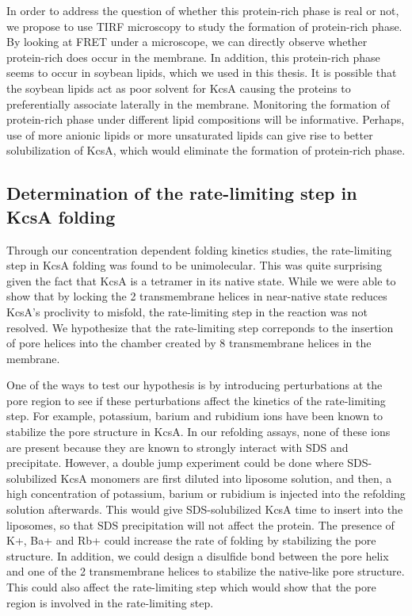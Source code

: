 In order to address the question of whether this protein-rich phase is real or not, we propose to use TIRF microscopy to study the formation of protein-rich phase. By looking at FRET under a microscope, we can directly observe whether protein-rich does occur in the membrane. In addition, this protein-rich phase seems to occur in soybean lipids, which we used in this thesis. It is possible that the soybean lipids act as poor solvent for KcsA causing the proteins to preferentially associate laterally in the membrane. Monitoring the formation of protein-rich phase under different lipid compositions will be informative. Perhaps, use of more anionic lipids or more unsaturated lipids can give rise to better solubilization of KcsA, which would eliminate the formation of protein-rich phase.

\subsection{Determination of the rate-limiting step in KcsA folding}
Through our concentration dependent folding kinetics studies, the rate-limiting step in KcsA folding was found to be unimolecular. This was quite surprising given the fact that KcsA is a tetramer in its native state. While we were able to show that by locking the 2 transmembrane helices in near-native state reduces KcsA's proclivity to misfold, the rate-limiting step in the reaction was not resolved. We hypothesize that the rate-limiting step correponds to the insertion of pore helices into the chamber created by 8 transmembrane helices in the membrane.

One of the ways to test our hypothesis is by introducing perturbations at the pore region to see if these perturbations affect the kinetics of the rate-limiting step. For example, potassium, barium and rubidium ions have been known to stabilize the pore structure in KcsA. In our refolding assays, none of these ions are present because they are known to strongly interact with SDS and precipitate. However, a double jump experiment could be done where SDS-solubilized KcsA monomers are first diluted into liposome solution, and then, a high concentration of potassium, barium or rubidium is injected into the refolding solution afterwards. This would give SDS-solubilized KcsA time to insert into the liposomes, so that SDS precipitation will not affect the protein. The presence of K+, Ba+ and Rb+ could increase the rate of folding by stabilizing the pore structure. In addition, we could design a disulfide bond between the pore helix and one of the 2 transmembrane helices to stabilize the native-like pore structure. This could also affect the rate-limiting step which would show that the pore region is involved in the rate-limiting step.

